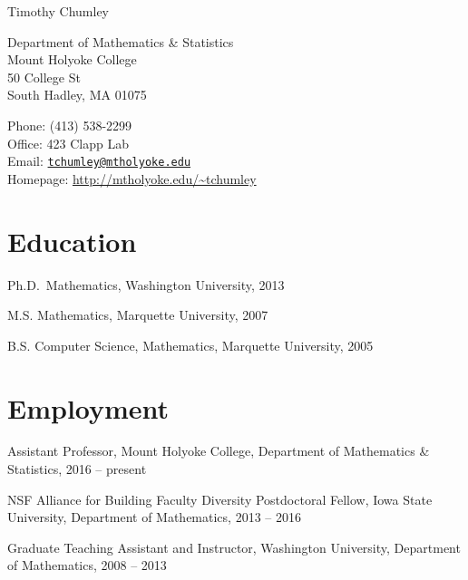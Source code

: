 \documentclass[10pt,letterpaper]{article}
\def\name{Timothy Chumley}
\renewenvironment{itemize}{
  \begin{list}{}{
    \setlength{\leftmargin}{1.5em}
    \setlength{\itemsep}{0.25em}
    \setlength{\parskip}{0pt}
    \setlength{\parsep}{0.25em}
  }
}{
  \end{list}
}
\providecommand{\tightlist}{%
  \setlength{\itemsep}{0pt}\setlength{\parskip}{0pt}}
\let\tightlist\relax
\begin{document}
{\huge \name}


\bigskip

\begin{minipage}[t]{0.495\textwidth}
  Department of Mathematics \& Statistics \\
  Mount Holyoke College \\
  50 College St \\
  South Hadley, MA 01075
\end{minipage}
\begin{minipage}[t]{0.495\textwidth}
  Phone: (413) 538-2299 \\
  Office: 423 Clapp Lab \\
  Email: \href{mailto:tchumley@mtholyoke.edu}{\tt tchumley@mtholyoke.edu} \\
  Homepage: \url{http://mtholyoke.edu/~tchumley}
\end{minipage}

\hypertarget{education}{%
\section*{Education}\label{education}}

\begin{itemize}
\tightlist
\item
  Ph.D.~Mathematics, Washington University, 2013
\item
  M.S. Mathematics, Marquette University, 2007
\item
  B.S. Computer Science, Mathematics, Marquette University, 2005
\end{itemize}

\hypertarget{employment}{%
\section*{Employment}\label{employment}}

\begin{itemize}
\tightlist
\item
  Assistant Professor, Mount Holyoke College, Department of Mathematics
  \& Statistics, 2016 -- present
\item
  NSF Alliance for Building Faculty Diversity Postdoctoral Fellow, Iowa
  State University, Department of Mathematics, 2013 -- 2016
\item
  Graduate Teaching Assistant and Instructor, Washington University,
  Department of Mathematics, 2008 -- 2013
\end{itemize}
\end{document}
